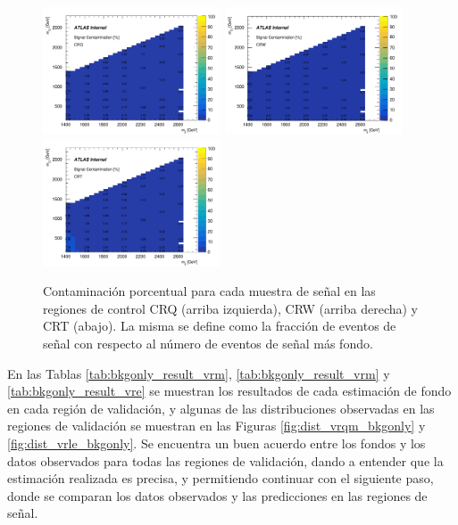 \begin{figure}[ht!]

  \centering
  \includegraphics[width=0.47\textwidth]{images/results/signal_contamination_bb_CRQ_139ifb.pdf}
  \includegraphics[width=0.47\textwidth]{images/results/signal_contamination_bb_CRW_139ifb.pdf}
  \includegraphics[width=0.47\textwidth]{images/results/signal_contamination_bb_CRT_139ifb.pdf}
  \caption{Contaminación porcentual para cada muestra de señal en las regiones de control CRQ (arriba izquierda), CRW (arriba derecha) y CRT (abajo). La misma se define como la fracción de eventos de señal con respecto al número de eventos de señal más fondo.}
  \label{fig:signal_contamination_CR_bb}

\end{figure}


En las Tablas \ref{tab:bkgonly_result_vrm}, \ref{tab:bkgonly_result_vrm} y \ref{tab:bkgonly_result_vre} se muestran los resultados de cada estimación de fondo en cada región de validación, y algunas de las distribuciones observadas en las regiones de validación se muestran en las Figuras \ref{fig:dist_vrqm_bkgonly} y \ref{fig:dist_vrle_bkgonly}. Se encuentra un buen acuerdo entre los fondos y los datos observados para todas las regiones de validación, dando a entender que la estimación realizada es precisa, y permitiendo continuar con el siguiente paso, donde se comparan los datos observados y las predicciones en las regiones de señal. 


